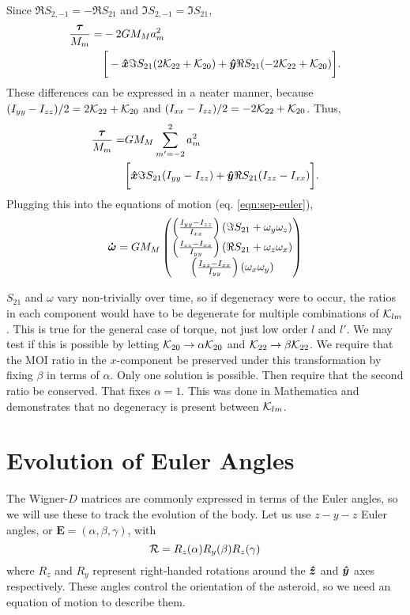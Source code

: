 \documentclass[aps,twocolumn,secnumarabic,balancelastpage,amsmath,amssymb,nofootinbib,floatfix]{revtex4-1}
\begin{document}
Since $\Re S_{2,-1}=-\Re S_{21}$ and $\Im S_{2,-1}=\Im S_{21}$,
\begin{equation*}
\begin{aligned}
\frac{\bm \tau}{M_m} = &-2GM_M a_m^2\\
&\bigg[-\bm{\hat x} \Im S_{21}(2\mathcal{K}_{22}+\mathcal{K}_{20})+\bm{\hat y} \Re S_{21}(-2\mathcal{K}_{22}+\mathcal{K}_{20})\bigg].
\end{aligned}
\end{equation*}
These differences can be expressed in a neater manner, because $(I_{yy}-I_{zz})/2=2\mathcal{K}_{22}+\mathcal{K}_{20}$ and $(I_{xx}-I_{zz})/2=-2\mathcal{K}_{22}+\mathcal{K}_{20}$. Thus,
\begin{equation*}
\begin{aligned}
\frac{\bm \tau}{M_m} = &GM_M \sum_{m'=-2}^2 a_m^2\\
&\bigg[\bm{\hat x} \Im S_{21}(I_{yy}-I_{zz})+\bm{\hat y} \Re S_{21}(I_{zz}-I_{xx})\bigg].
\end{aligned}
\end{equation*}
Plugging this into the equations of motion (eq. \ref{eqn:sep-euler}),
\begin{equation*}
\bm{\dot \omega} = GM_M\left( \begin{matrix}
\left( \frac{I_{yy}-I_{zz}}{I_{xx}} \right)\left( \Im S_{21}+\omega_y\omega_z \right)\\
\left( \frac{I_{zz}-I_{xx}}{I_{yy}} \right)\left( \Re S_{21}+\omega_z\omega_x \right)\\
\left( \frac{I_{zz}-I_{xx}}{I_{yy}} \right)\left( \omega_x\omega_y \right)\\
\end{matrix} \right)
\end{equation*}

$S_{21}$ and $\omega$ vary non-trivially over time, so if degeneracy were to occur, the ratios in each component would have to be degenerate for multiple combinations of $\mathcal{K}_{lm}$. This is true for the general case of torque, not just low order $l$ and $l'$. We may test if this is possible by letting $\mathcal{K}_{20}\rightarrow \alpha \mathcal{K}_{20}$ and $\mathcal{K}_{22}\rightarrow \beta \mathcal{K}_{22}$. We require that the MOI ratio in the $x$-component be preserved under this transformation by fixing $\beta$ in terms of $\alpha$. Only one solution is possible. Then require that the second ratio be conserved. That fixes $\alpha=1$. This was done in Mathematica and demonstrates that no degeneracy is present between $\mathcal{K}_{lm}$.



\section{Evolution of Euler Angles}
The Wigner-$D$ matrices are commonly expressed in terms of the Euler angles, so we will use these to track the evolution of the body. Let us use $z-y-z$ Euler angles, or $\bm E = (\alpha, \beta, \gamma)$, with
\begin{equation}
\mathcal{R} = R_z(\alpha) R_y(\beta) R_z(\gamma)
\label{eqn:euler-angle-rotation}
\end{equation}
where $R_z$ and $R_y$ represent right-handed rotations around the $\bm{\hat z}$ and $\bm{\hat y}$ axes respectively. These angles control the orientation of the asteroid, so we need an equation of motion to describe them.
\end{document}
